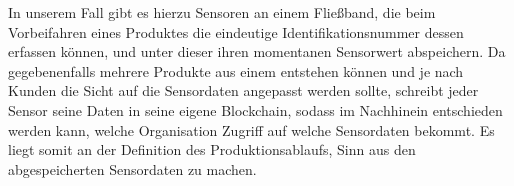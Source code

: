 In unserem Fall gibt es hierzu Sensoren an einem Fließband, die beim Vorbeifahren eines Produktes die eindeutige Identifikationsnummer dessen erfassen können, und unter dieser ihren momentanen Sensorwert abspeichern.
Da gegebenenfalls mehrere Produkte aus einem entstehen können und je nach Kunden die Sicht auf die Sensordaten angepasst werden sollte, schreibt jeder Sensor seine Daten in seine eigene Blockchain, sodass im Nachhinein entschieden werden kann, welche Organisation Zugriff auf welche Sensordaten bekommt. Es liegt somit an der Definition des Produktionsablaufs, Sinn aus den abgespeicherten Sensordaten zu machen.